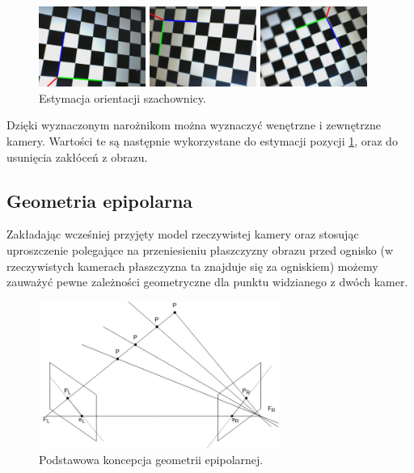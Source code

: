 \documentclass{article}
\begin{document}
\begin{figure}
\centering
		\begin{minipage}{3.5cm}
			\includegraphics[width=3.5cm]{left8.jpg}
		\end{minipage}
		\begin{minipage}{3.5cm}
			\includegraphics[width=3.5cm]{left17.jpg}
		\end{minipage}
		\begin{minipage}{3.5cm}
			\includegraphics[width=3.5cm]{left24.jpg}
		\end{minipage}
	\caption{Estymacja orientacji szachownicy. }
	\label{fig:pose}
\end{figure}

Dzięki wyznaczonym narożnikom można wyznaczyć wenętrzne i zewnętrzne kamery. Wartości te są następnie wykorzystane do estymacji pozycji \ref{fig:pose}, oraz do usunięcia zakłóceń z obrazu. 

\subsection{Geometria epipolarna}

Zakładając wcześniej przyjęty model rzeczywistej kamery oraz stosując uproszczenie polegające na przeniesieniu płaszczyzny obrazu przed ognisko (w rzeczywistych kamerach płaszczyzna ta znajduje się za ogniskiem) możemy zauważyć pewne zależności geometryczne dla punktu widzianego z dwóch kamer. 

\begin{figure}
\centering
	\includegraphics[width=0.70\textwidth]{epipolar.jpg}\par\vspace{1cm}
\caption{Podstawowa koncepcja geometrii epipolarnej.}
	\label{fig:gradient}
\end{figure}
\end{document}
